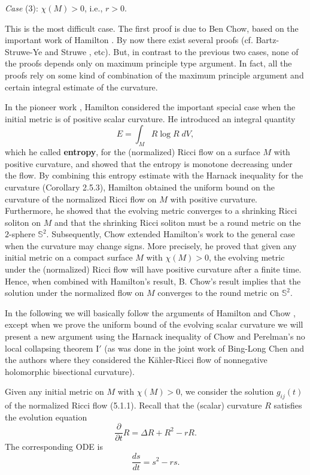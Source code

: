 \medskip
{\it Case} (3): $\chi(M)>0$, i.e., $r>0$.

\smallskip
This is the most difficult case. The first proof is due to Ben
Chow\cite{Chow}, based on the important work of Hamilton
\cite{Ha88}.  By now there exist several proofs (cf.
Bartz-Struwe-Ye \cite{BSY} and Struwe \cite{St}, etc). But, in
contrast to the previous two cases, none of the proofs depends
only on maximum principle type argument. In fact, all the proofs
rely on some kind of combination of the maximum principle argument
and certain integral estimate of the curvature.

In the pioneer work \cite{Ha88}, Hamilton considered the important
special case when the initial metric is of positive scalar
curvature. He introduced an integral quantity
$$
E=\int_M R \log R \;dV,
$$
which he called {\bf entropy}, for the (normalized) Ricci flow on
a surface $M$ with positive curvature, and showed that the entropy
is monotone decreasing under the flow. By combining this entropy
estimate with the Harnack inequality for the curvature (Corollary
2.5.3), Hamilton obtained the uniform bound on the curvature of
the normalized Ricci flow on $M$ with positive curvature.
Furthermore, he showed that the evolving metric converges to a
shrinking Ricci soliton on $M$ and that the shrinking Ricci
soliton must be a round metric on the $2$-sphere $\mathbb S^2$.
Subsequently, Chow \cite{Chow} extended Hamilton's work to the
general case when the curvature may change signs. More precisely,
he proved that given any initial metric on a compact surface $M$
with $\chi(M)>0$, the evolving metric under the (normalized) Ricci
flow will have positive curvature after a finite time. Hence, when
combined with Hamilton's result, B. Chow's result implies that the
solution under the normalized flow on $M$ converges to the round
metric on $\mathbb S^2$.

In the following we will basically follow the arguments of
Hamilton \cite{Ha88} and Chow \cite{Chow}, except when we prove
the uniform bound of the evolving scalar curvature we will present
a new argument using the Harnack inequality of Chow \cite{Chow}
and Perelman's no local collapsing theorem I$'$ (as was done in
the joint work of Bing-Long Chen and the authors \cite{CCZ} where
they considered the K\"ahler-Ricci flow of nonnegative holomorphic
bisectional curvature).

Given any initial metric on $M$ with $\chi(M)>0$, we consider the
solution $g_{ij}(t)$ of the normalized Ricci flow (5.1.1). Recall
that the (scalar) curvature $R$ satisfies the evolution equation
$$
\frac{\partial }{\partial t}R=\Delta R+R^2-rR.
$$
The corresponding ODE is \begin{equation}
\frac{ds}{dt}=s^2-rs.  %
\end{equation}

